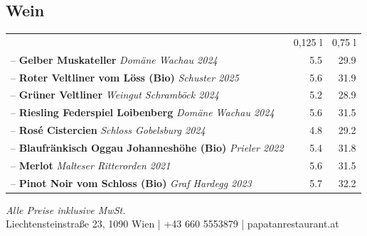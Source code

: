 \documentclass[a4paper,12pt]{article}
\begin{document}
\begin{multicols}{2}
\section*{Wein}
\begin{tabular}{Lrr}
& 0,125 l & 0,75 l\\
-- \textbf{Gelber Muskateller} \emph{Domäne Wachau 2024} & 5.5 & 29.9\\
-- \textbf{Roter Veltliner vom Löss (Bio)} \emph{Schuster 2025} & 5.6 & 31.9\\
-- \textbf{Grüner Veltliner} \emph{Weingut Schramböck 2024} & 5.2 & 28.9\\
-- \textbf{Riesling Federspiel Loibenberg} \emph{Domäne Wachau 2024} & 5.6 & 31.5\\
-- \textbf{Rosé Cistercien} \emph{Schloss Gobelsburg 2024} & 4.8 & 29.2\\
-- \textbf{Blaufränkisch Oggau Johanneshöhe (Bio)} \emph{Prieler 2022} & 5.4 & 31.8\\
-- \textbf{Merlot} \emph{Malteser Ritterorden 2021} & 5.6 & 31.5\\
-- \textbf{Pinot Noir vom Schloss (Bio)} \emph{Graf Hardegg 2023} & 5.7 & 32.2
\end{tabular}

\end{multicols}

\vfill
\begin{center}
    {\small \textit{Alle Preise inklusive MwSt.}}\\
    {\small Liechtensteinstraße 23, 1090 Wien \quad | \quad +43 660 5553879 \quad | \quad papatanrestaurant.at}
\end{center}

\newpage

\end{document}
